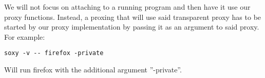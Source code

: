 \documentclass[a4paper]{article}
\begin{document}
We will not focus on attaching to a running program and then have it use our
proxy functions. %
Instead, a proxing that will use said transparent proxy has to be started by our
proxy implementation by passing it as an argument to said proxy. For example:

\begin{verbatim}
soxy -v -- firefox -private
\end{verbatim}

Will run firefox with the additional argument ''-private''.
\end{document}
